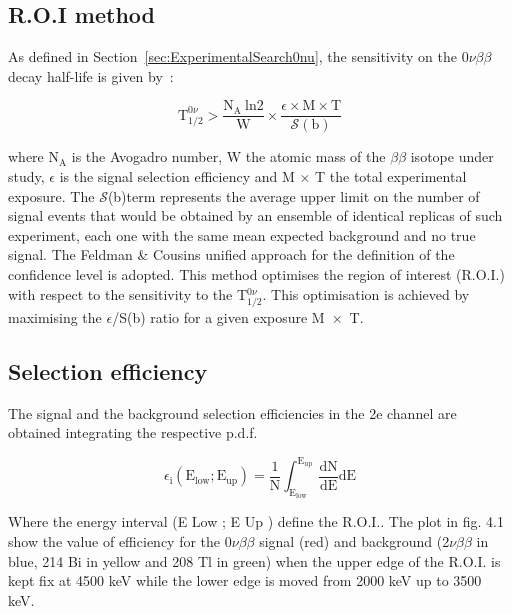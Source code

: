\documentclass[main.tex]{subfiles}
\begin{document}
\subsection{R.O.I method}


\NI As defined in Section~\ref{sec:ExperimentalSearch0nu}, the sensitivity on the 0$\nu\beta\beta$ decay half-life is given by~:


\begin{equation}
\text{T}_{\text{1/2}}^{\text{0}\nu} > \frac{\text{N}_\text{A}~\text{ln2}}{\text{W}} \times \frac{\epsilon \times \text{M} \times \text{T}}{\mathcal{S}(\text{b})}
\end{equation}


\NI where N$_\text{A}$ is the Avogadro number, W the atomic mass of the $\beta\beta$ isotope under study, $\epsilon$ is the signal selection efficiency and M $\times$ T the total experimental exposure. The $\mathcal{S}$(b)term represents the average upper limit on the number of signal events that would be obtained by an ensemble of identical replicas of such experiment, each one with the same mean expected background and no true signal. The Feldman \& Cousins unified approach for the definition of the confidence level is adopted. This method optimises the region of interest (R.O.I.) with respect to the sensitivity to the T$_{\text{1/2}}^{\text{0}\nu}$. This optimisation is achieved by maximising the $\epsilon$/S(b) ratio for a given exposure M~$\times$~T.


\subsection{Selection efficiency}


\NI The signal and the background selection efficiencies in the 2e channel are obtained integrating the respective p.d.f.


\begin{equation}
\epsilon_\text{i} (\text{E}_{\text{low}};\text{E}_{\text{up}}) = \frac{1}{\text{N}} \int_{\text{E}_{\text{low}}}^{\text{E}_{\text{up}}} \frac{\text{dN}}{\text{dE}} \text{dE}
\end{equation}


\bigskip 


\NI Where the energy interval (E Low ; E Up ) define the R.O.I.. The plot in fig. 4.1 show the value of efficiency for the 0$\nu\beta\beta$ signal (red) and background (2$\nu\beta\beta$ in blue, 214 Bi in yellow and 208 Tl in green) when the upper edge of the R.O.I. is kept fix at 4500 keV while the lower edge is moved from 2000 keV up to 3500 keV.
\end{document}
